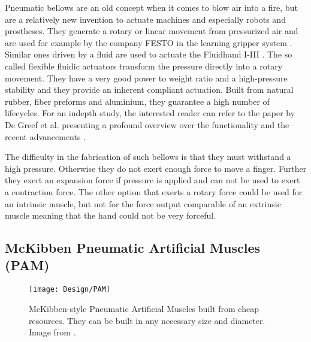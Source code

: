 \documentclass[main]{subfiles}
\begin{document}
Pneumatic bellows are an old concept when it comes to blow air into a fire, but are a relatively new invention to actuate machines and especially robots and prostheses. They generate a rotary or linear movement from pressurized air and are used for example by the company FESTO in the learning gripper system \cite{learning-gripper}. Similar ones driven by a fluid are used to actuate the Fluidhand I-III \cite{Gaiser2009}. The so called flexible fluidic actuators transform the pressure directly into a rotary movement. They have a very good power to weight ratio and a high-pressure stability and they provide an inherent compliant actuation. Built from natural rubber, fiber preforms and aluminium, they guarantee a high number of lifecycles. For an indepth study, the interested reader can refer to the paper by De Greef et al. presenting a profound overview over the functionality and the recent advancements \cite{DeGreef2009}.

The difficulty in the fabrication of such bellows is that they must withstand a high pressure. Otherwise they do not exert enough force to move a finger. Further they exert an expansion force if pressure is applied and can not be used to exert a contraction force. The other option that exerts a rotary force could be used for an intrinsic muscle, but not for the force output comparable of an extrinsic muscle meaning that the hand could not be very forceful.

\subsection{McKibben Pneumatic Artificial Muscles (PAM)}

\begin{figure}[H]
\centering
\texttt{[image: Design/PAM]}
\caption[Pneumatic Artificial Muscles]{McKibben-style Pneumatic Artificial Muscles built from cheap resources. They can be built in any necessary size and diameter. Image from \cite{PAMInstructables}.}
\label{PAM}
\end{figure}
\end{document}
